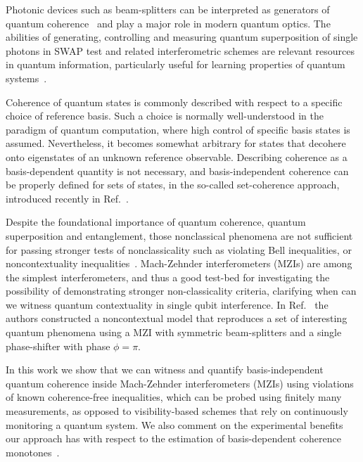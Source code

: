 \documentclass[letterpaper,onecolumn,12pt,accepted=2024-01-17]{article}
\begin{document}
Photonic devices such as beam-splitters can be interpreted as generators of quantum coherence~\cite{masini2021coherence,ares2022beam} and play a major role in modern quantum optics. The abilities of generating, controlling and measuring quantum superposition of single photons in SWAP test and related interferometric schemes are relevant resources in quantum information, particularly useful for learning properties of quantum systems~\cite{ekert2002direct,horodecki2002method,oszmaniec2021measuring}. 

Coherence of quantum states is commonly described with respect to a specific choice of reference basis. Such a choice is normally well-understood in the paradigm of quantum computation, where high control of specific basis states is assumed. Nevertheless, it becomes somewhat arbitrary for states that decohere onto eigenstates of an unknown reference observable. Describing coherence as a basis-dependent quantity is not necessary, and basis-independent coherence can be properly defined for sets of states, in the so-called set-coherence approach{, introduced recently in Ref.}~\cite{designolle2021set}. 

Despite the foundational importance of quantum coherence, quantum superposition and entanglement, those nonclassical phenomena are not sufficient for passing stronger tests of nonclassicality such as violating Bell inequalities, or noncontextuality inequalities~\cite{werner1989quantum,spekkens2007evidence,hardy1999disentangling}. {Mach-Zehnder interferometers (MZIs)} are among the simplest interferometers, and thus a good test-bed for investigating the possibility of demonstrating stronger non-classicality criteria, clarifying when can we witness quantum contextuality in single qubit interference. In Ref.~\cite{catani2021interference} the authors constructed a noncontextual model that reproduces a set of interesting quantum phenomena using a MZI with symmetric beam-splitters and a single phase-shifter with phase $\phi = \pi$. 

In this work we show that we can witness and quantify basis-independent quantum coherence inside Mach-Zehnder interferometers (MZIs) using violations of known coherence-free inequalities, which can be probed using finitely many measurements, as opposed to visibility-based schemes that { rely} on continuously monitoring a quantum system. We also comment on the experimental benefits our approach has with respect to the estimation of basis-dependent coherence monotones~\cite{Streltsov17}.
\end{document}
